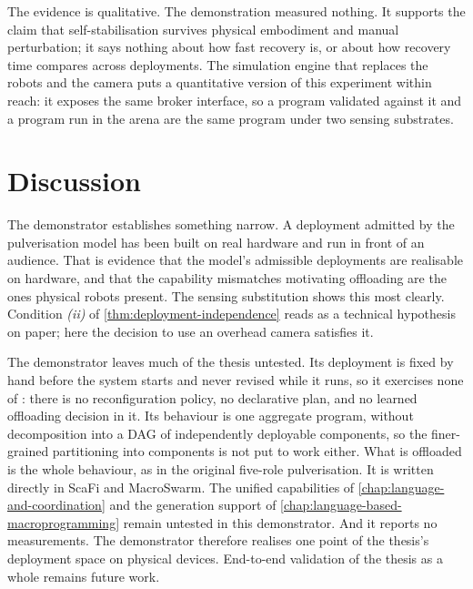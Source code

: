 The evidence is qualitative.
%
The demonstration measured nothing.
It supports the claim that self-stabilisation survives physical embodiment and manual perturbation;
it says nothing about how fast recovery is, or about how recovery time compares across deployments.
%
The simulation engine that replaces the robots and the camera puts a quantitative version of this experiment within reach:
it exposes the same broker interface,
so a program validated against it and a program run in the arena are the same program under two sensing substrates.

\section{Discussion}
\label{sec:emerge-discussion}

The demonstrator establishes something narrow.
%
A deployment admitted by the pulverisation model has been built on real hardware and run in front of an audience.
%
That is evidence that the model's admissible deployments are realisable on hardware,
and that the capability mismatches motivating offloading are the ones physical robots present.
%
The sensing substitution shows this most clearly.
Condition \emph{(ii)} of \cref{thm:deployment-independence} reads as a technical hypothesis on paper;
here the decision to use an overhead camera satisfies it.

The demonstrator leaves much of the thesis untested.
%
Its deployment is fixed by hand before the system starts and never revised while it runs,
so it exercises none of :
there is no reconfiguration policy, no declarative plan, and no learned offloading decision in it.
%
Its behaviour is one aggregate program, without decomposition into a \ac{DAG} of independently deployable components,
so the finer-grained partitioning into components is not put to work either.
What is offloaded is the whole behaviour, as in the original five-role pulverisation.
%
It is written directly in ScaFi and MacroSwarm.
The unified capabilities of \cref{chap:language-and-coordination} and the generation support of \cref{chap:language-based-macroprogramming} remain untested in this demonstrator.
%
And it reports no measurements.
%
The demonstrator therefore realises one point of the thesis's deployment space on physical devices.
End-to-end validation of the thesis as a whole remains future work.

